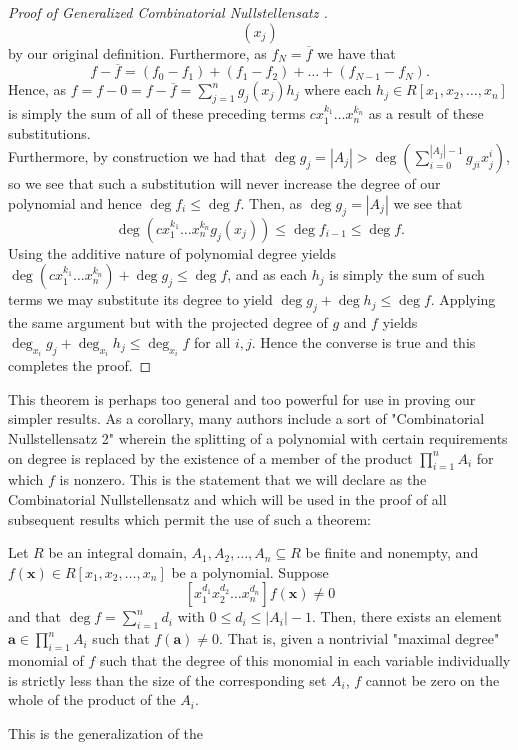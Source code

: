 \begin{proof}[Proof of Generalized Combinatorial Nullstellensatz \cite{grynkiewicz_2013}]
\[\left( x_j \right)\] by our original definition. Furthermore, as $f_N =
\overline{f}$ we have that \[ f - \overline{f} = \left( f_0 - f_1 \right) +
\left( f_1 - f_2 \right) + \ldots + \left( f_{N-1} - f_N \right) .\] Hence, as
$f = f - 0 = f - \overline{f} = \sum_{j=1}^{n} g_j \left( x_{j} \right) h_j$
where each $h_j \in R[x_1, x_2, \ldots, x_{n}]$ is simply the sum of all of
these preceding terms $cx_1^{k_1}\ldots x_{n}^{ k_n}$ as a result of these
substitutions. \\Furthermore, by construction we had that $\deg g_j = \left| A_{j} \right| > \deg
\left( \sum_{i=0}^{\left| A_j \right| -1} g_{ji} x_{j}^{i} \right) $, so we see
that such a substitution will never increase the degree of our polynomial and
hence $\deg f_i \le \deg f$. Then, as $\deg g_j = \left| A_j \right| $ we see
that \[\deg\left( cx_1^{k_1}\ldots x_{n}^{k_n}g_j(x_j) \right) \le \deg
f_{i-1} \le \deg f.\] Using the additive nature of polynomial degree yields
\\$\deg \left( cx_1^{k_1}\ldots x_{n}^{ k_n} \right) + \deg g_j \le \deg f$,
and as each $h_j$ is simply the sum of such terms we may substitute its degree
to yield $\deg g_j + \deg h_j \le \deg f$.  Applying the same argument but with
the projected degree of $g$ and $f $ yields \\$\deg _{x_i} g_j + \deg _{x_i}
h_j \le \deg _{x_i} f$ for all $i,j$. Hence the converse is true and this
completes the proof.  \end{proof} This theorem is perhaps too general and too
powerful for use in proving our simpler results. As a corollary, many authors
include a sort of "Combinatorial Nullstellensatz 2" wherein the splitting of a
polynomial with certain requirements on degree is replaced by the existence of
a member of the product $\prod_{i= 1}^{n} A_i $ for which $f$ is nonzero. This
is the statement that we will declare as the Combinatorial Nullstellensatz and
which will be used in the proof of all subsequent results which permit the use of such a theorem:
\begin{theorem} Let
	$R$ be an integral domain, $A_1, A_2, \ldots, A_n \subseteq R$ be
	finite and nonempty, and \\$f\left( \textbf{x} \right) \in R[x_1, x_2,
	\ldots, x_{n}]$ be a polynomial. Suppose \[ [x_1^{d_1}x_2^{d_2}\ldots
	x_{n}^{d_n}] f\left( \textbf{x} \right) \neq 0 \] and that $\deg f =
	\sum_{i=1}^{n} d_i$ with $0 \le d_i \le \left| A_i \right| -1$. Then,
	there exists an element $ \textbf{a} \in \prod_{i= 1}^{n} A_i $ such
	that $f\left( \textbf{a} \right) \neq 0$. That is, given a nontrivial
	"maximal degree" monomial of $f$ such that the degree of this monomial
	in each variable individually is strictly less than the size of the
	corresponding set $A_i$, $f$ cannot be zero on the whole of the product
	of the $A_i$.  \end{theorem} This is the generalization of the
